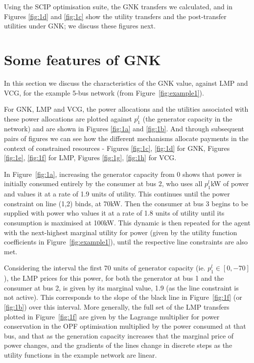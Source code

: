 Using the SCIP optimisation suite, the GNK transfers we calculated, and in Figures \ref{fig:1d} and \ref{fig:1c} show the utility transfers and the post-transfer utilities under GNK; we discuss these figures next.


\section{Some features of GNK}\label{sec:features}

In this section we discuss the characteristics of the GNK value, against LMP and VCG, for the example 5-bus network (from Figure~\ref{fig:example1}).

For GNK, LMP and VCG, the power allocations and the utilities associated with these power allocations are plotted against $p_1^l$ (the generator capacity in the network) and are shown in Figures \ref{fig:1a} and \ref{fig:1b}.
And through subsequent pairs of figures we can see how the different mechanisms allocate payments in the context of constrained resources - Figures \ref{fig:1c}, \ref{fig:1d} for GNK, Figures \ref{fig:1e}, \ref{fig:1f} for LMP, Figures \ref{fig:1g}, \ref{fig:1h} for VCG.

\iffigures
% 

\fi

In Figure~\ref{fig:1a}, increasing the generator capacity from $0$ shows that power is initially consumed entirely by the consumer at bus 2, 
who uses all $p_1^l$kW of power and values it at a rate of 1.9 units of utility. This continues until the power constraint on line (1,2) binds, at 70kW.
Then the consumer at bus 3 begins to be supplied with power who values it at a rate of 1.8 units of utility until its consumption is maximised at 100kW. 
This dynamic is then repeated for the agent with the next-highest marginal utility for power (given by the utility function coefficients in Figure~\ref{fig:example1}), until the respective line constraints are also met.

Considering the interval the first 70 units of generator capacity (ie. $p_1^l \in [0,-70]$), the LMP prices for this power, for both the generator at bus 1 and the consumer at bus 2, is given by its marginal value, 1.9 (as the line constraint is not active). This corresponds to the slope of the black line in Figure~\ref{fig:1f} (or \ref{fig:1b}) over this interval. 
More generally, the full set of the LMP transfers plotted in Figure~\ref{fig:1f} are given by the Lagrange multiplier for power conservation in the OPF optimisation multiplied by the power consumed at that bus, and that as the generation capacity increases that the marginal price of power changes, and the gradients of the lines change in discrete steps as the utility functions in the example network are linear.

